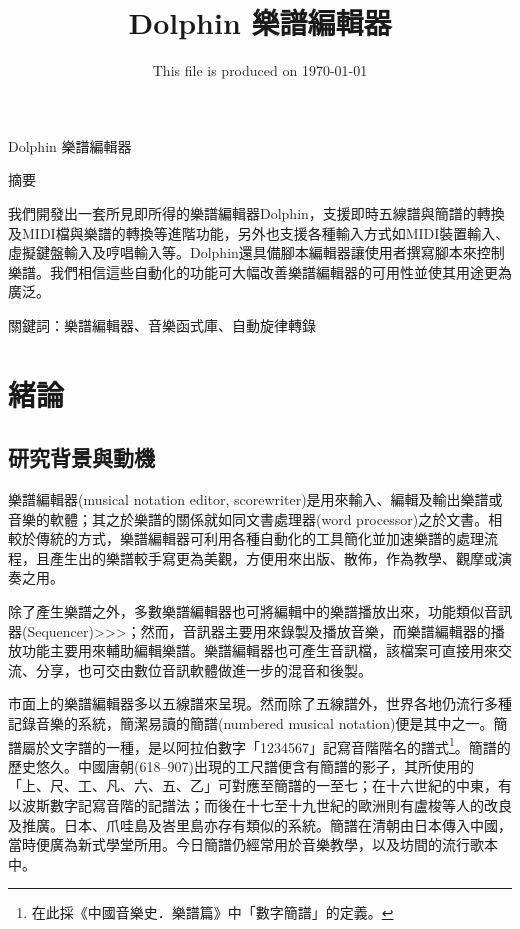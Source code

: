 \documentclass[12pt,a4paper,oneside]{report}
\begin{document}
\title{Dolphin 樂譜編輯器}
\date{This file is produced on \today}
\maketitle

\begin{center}
Dolphin 樂譜編輯器

摘要
\end{center}

我們開發出一套所見即所得的樂譜編輯器Dolphin，支援即時五線譜與簡譜的轉換及MIDI檔與樂譜的轉換等進階功能，另外也支援各種輸入方式如MIDI裝置輸入、虛擬鍵盤輸入及哼唱輸入等。Dolphin還具備腳本編輯器讓使用者撰寫腳本來控制樂譜。我們相信這些自動化的功能可大幅改善樂譜編輯器的可用性並使其用途更為廣泛。

關鍵詞：樂譜編輯器、音樂函式庫、自動旋律轉錄


\tableofcontents

\chapter{緒論}
\section{研究背景與動機}


樂譜編輯器(musical notation editor, scorewriter)是用來輸入、編輯及輸出樂譜或音樂的軟體；其之於樂譜的關係就如同文書處理器(word processor)之於文書。相較於傳統的方式，樂譜編輯器可利用各種自動化的工具簡化並加速樂譜的處理流程，且產生出的樂譜較手寫更為美觀，方便用來出版、散佈，作為教學、觀摩或演奏之用。

除了產生樂譜之外，多數樂譜編輯器也可將編輯中的樂譜播放出來，功能類似音訊器(Sequencer)>>>；然而，音訊器主要用來錄製及播放音樂，而樂譜編輯器的播放功能主要用來輔助編輯樂譜。樂譜編輯器也可產生音訊檔，該檔案可直接用來交流、分享，也可交由數位音訊軟體做進一步的混音和後製。

市面上的樂譜編輯器多以五線譜來呈現。然而除了五線譜外，世界各地仍流行多種記錄音樂的系統，簡潔易讀的簡譜(numbered musical notation)便是其中之一。簡譜屬於文字譜的一種\cite{chinaEncyclopedia}，是以阿拉伯數字「1234567」記寫音階階名的譜式\footnote{在此採《中國音樂史．樂譜篇》中「數字簡譜」\cite{chinaMusicHistory}的定義。}。簡譜的歷史悠久。中國唐朝(618–907)出現的工尺譜便含有簡譜的影子，其所使用的「上、尺、工、凡、六、五、乙」可對應至簡譜的一至七\cite{wiki}；在十六世紀的中東，有以波斯數字記寫音階的記譜法；而後在十七至十九世紀的歐洲則有盧梭等人的改良及推廣。日本、爪哇島及峇里島亦存有類似的系統\cite{britannica}。簡譜在清朝由日本傳入中國，當時便廣為新式學堂所用。今日簡譜仍經常用於音樂教學，以及坊間的流行歌本中。
\end{document}
